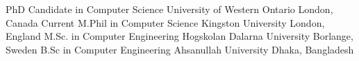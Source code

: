 \begin{cventries}
 \cventry
  {PhD Candidate in Computer Science} %
  {University of Western Ontario}  %
  {London, Canada} %
  {Current} %
  {}
  \vspace{-0.5mm}
 \vspace{-5mm}
 \cventry
  {M.Phil in Computer Science}  %
  {Kingston University}  %
  {London, England} %
  {} %
  {}
  \vspace{-0.5mm}
 \vspace{-5mm}
 \cventry
  {M.Sc. in Computer Engineering}  %
  {Hogskolan Dalarna University}  %
  {Borlange, Sweden} %
  {} %
  {}
  \vspace{-0.5mm}
 \vspace{-5mm}
 \cventry
  {B.Sc in Computer Engineering}  %
  {Ahsanullah University}  %
  {Dhaka, Bangladesh} %
  {} %
  {}
  \vspace{-0.5mm}
\end{cventries}
\vspace{-5mm}


